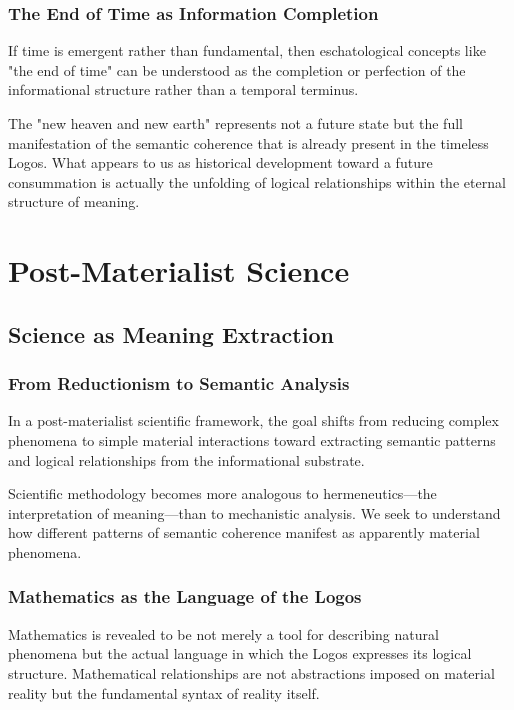 \documentclass[12pt,a4paper]{article}
\begin{document}
\subsubsection{The End of Time as Information Completion}

If time is emergent rather than fundamental, then eschatological concepts like "the end of time" can be understood as the completion or perfection of the informational structure rather than a temporal terminus.

The "new heaven and new earth" represents not a future state but the full manifestation of the semantic coherence that is already present in the timeless Logos. What appears to us as historical development toward a future consummation is actually the unfolding of logical relationships within the eternal structure of meaning.

\section{Post-Materialist Science}

\subsection{Science as Meaning Extraction}

\subsubsection{From Reductionism to Semantic Analysis}

In a post-materialist scientific framework, the goal shifts from reducing complex phenomena to simple material interactions toward extracting semantic patterns and logical relationships from the informational substrate.

Scientific methodology becomes more analogous to hermeneutics—the interpretation of meaning—than to mechanistic analysis. We seek to understand how different patterns of semantic coherence manifest as apparently material phenomena.

\subsubsection{Mathematics as the Language of the Logos}

Mathematics is revealed to be not merely a tool for describing natural phenomena but the actual language in which the Logos expresses its logical structure. Mathematical relationships are not abstractions imposed on material reality but the fundamental syntax of reality itself.
\end{document}
